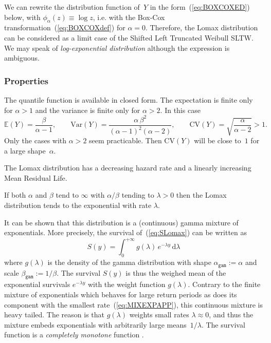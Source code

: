 \documentclass[a4paper]{report}
\newcommand{\Esp}{\mathbb{E}}
\newcommand{\Var}{\textrm{Var}}
\begin{document}
We can rewrite the distribution function of~$Y$ in the
form~(\ref{eq:BOXCOXED}) below, with $\phi_\alpha(z) \equiv \log z$,
i.e. with the Box-Cox transformation~(\ref{eq:BOXCOXdef}) for $\alpha
=0$. Therefore, the Lomax distribution can be considered as a limit
case of the Shifted Left Truncated Weibull SLTW. We may speak of
\textit{log-exponential distribution} although the expression is
ambiguous.  

%

\subsubsection*{Properties}
The quantile function is available in closed form.
The expectation is finite only for $\alpha > 1$ and the variance is finite 
only for $\alpha>2$.
In this case
$$
   \Esp(Y) = \frac{\beta}{\alpha-1},   \qquad 
   \Var(Y) = \frac{\alpha \,\beta^2}{(\alpha-1)^2(\alpha-2)}, \qquad
   \textrm{CV}(Y) = \sqrt{\frac{\alpha}{\alpha-2}} >1.
$$
Only the cases with $\alpha>2$ seem practicable. Then $\textrm{CV}(Y)$
will be close to~$1$ for a large shape~$\alpha$.

The Lomax distribution has a decreasing hazard rate and a linearly
increasing Mean Residual Life.

If both $\alpha$ and $\beta$ tend to $\infty$ with $\alpha/\beta$
tending to $\lambda >0$ then the Lomax distribution tends to the
exponential with rate $\lambda$.

It can be shown that this distribution
is a (continuous) gamma mixture of exponentials.  
More precisely, the survival of~(\ref{eq:SLomax}) can
be written as
$$ 
S(y) = \int_{0}^{+\infty} g(\lambda) \, e^{-\lambda y}
\,\mathrm{d}\lambda
$$
%
where $g(\lambda)$ is the density of the gamma distribution with shape
$\alpha_{\texttt{gam}}:=\alpha$ and scale $\beta_{\texttt{gam}} := 1/\beta$. The
survival $S(y)$ is thus the weighed mean of the exponential survivals
$e^{-\lambda y}$ with the weight function $g(\lambda)$. Contrary to 
the finite mixture of exponentials which behaves for large return periods 
as does its component with the smallest rate~(\ref{eq:MIXEXPAPP}), 
this continuous mixture is heavy tailed. The reason is that
$g(\lambda)$ weights small rates $\lambda \approx 0$, and thus the mixture 
embeds exponentials with arbitrarily large means~$1/\lambda$. The survival function is a 
\textit{completely monotone} function \citep{FELLER2}.
\end{document}

